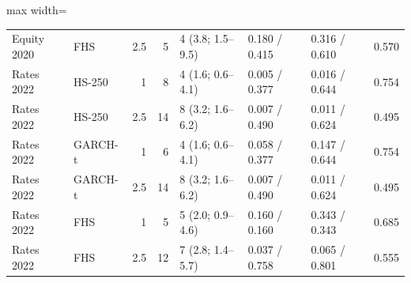 \begin{table}[htbp]
{\begin{adjustbox}{max width=\textwidth}
\begin{tabular}{llrrlllr}
Equity 2020 & FHS & 2.5 & 5 & 4 (3.8; 1.5--9.5) & 0.180 / 0.415 & 0.316 / 0.610 & 0.570 \\
Rates 2022 & HS-250 & 1 & 8 & 4 (1.6; 0.6--4.1) & 0.005 / 0.377 & 0.016 / 0.644 & 0.754 \\
Rates 2022 & HS-250 & 2.5 & 14 & 8 (3.2; 1.6--6.2) & 0.007 / 0.490 & 0.011 / 0.624 & 0.495 \\
Rates 2022 & GARCH-t & 1 & 6 & 4 (1.6; 0.6--4.1) & 0.058 / 0.377 & 0.147 / 0.644 & 0.754 \\
Rates 2022 & GARCH-t & 2.5 & 14 & 8 (3.2; 1.6--6.2) & 0.007 / 0.490 & 0.011 / 0.624 & 0.495 \\
Rates 2022 & FHS & 1 & 5 & 5 (2.0; 0.9--4.6) & 0.160 / 0.160 & 0.343 / 0.343 & 0.685 \\
Rates 2022 & FHS & 2.5 & 12 & 7 (2.8; 1.4--5.7) & 0.037 / 0.758 & 0.065 / 0.801 & 0.555 \\
\bottomrule
\end{tabular}
\end{adjustbox}}
\end{table}
